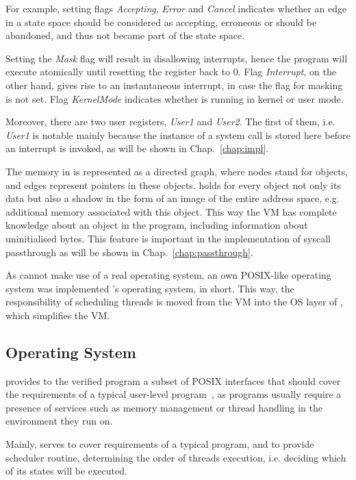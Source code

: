  For example, setting flags \textit{Accepting}, \textit{Error} and \textit{Cancel} indicates whether an edge in a state space should be considered as accepting, erroneous or should be abandoned, and thus not became part of the state space.


Setting the \textit{Mask} flag will result in disallowing interrupts, hence the program will execute atomically until resetting the register back to 0. Flag \textit{Interrupt}, on the other hand, gives rise to an instantaneous interrupt, in case the flag for masking is not set. Flag \textit{KernelMode} indicates whether \divm is running in kernel or user mode.


Moreover, there are two user registers, \textit{User1} and \textit{User2}. The first of them, i.e. \textit{User1} is notable mainly because the instance of a system call is stored here before an interrupt is invoked, as will be shown in Chap.~\ref{chap:impl}.

The memory in \divm is represented as a directed graph, where nodes stand for objects, and edges represent pointers in these objects. \divm holds for every object not only its data but also a shadow in the form of an image of the entire address space, e.g. additional memory associated with this object. This way the VM has complete knowledge about an object in the program, including information about uninitialised bytes. This feature is important in the implementation of syscall passthrough as will be shown in Chap.~\ref{chap:passthrough}.

As \divine cannot make use of a real operating system, an own POSIX-like operating system was implemented \- \divine’s operating system, \dios in short. This way, the responsibility of scheduling threads is moved from the VM into the OS layer of \dios, which simplifies the VM.

\subsection{Operating System}

\dios provides to the verified program a subset of POSIX interfaces that should cover the requirements of a typical user-level program~\cite{Divine}, as programs usually require a presence of services such as memory management or thread handling in the environment they run on.

Mainly, \dios serves to cover requirements of a typical program, and to provide scheduler routine, determining the order of threads execution, i.e. deciding which of its states will be executed.

